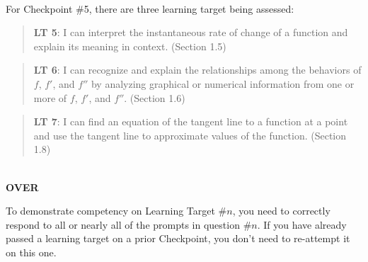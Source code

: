 \documentclass[11 pt]{article}
\begin{document}
\noindent \hrulefill \\

 For Checkpoint \#5, there are three learning target being assessed: 

\begin{quote}
{\bf LT 5}:  I can interpret the instantaneous rate of change of a function and explain its meaning in context.  (Section 1.5)
\end{quote}

\begin{quote}
{\bf LT 6}: I can recognize and explain the relationships among the behaviors of $f$, $f'$, and $f''$ by analyzing graphical or numerical information from one or more of $f$, $f'$, and $f''$. (Section 1.6)
\end{quote}

\begin{quote}
{\bf LT 7}: I can find an equation of the tangent line to a function at a point and use the tangent line to approximate values of the function. (Section 1.8)
\end{quote}


\noindent \hrulefill \\

\vfill \hfill {\bf OVER} 

\pagebreak


\noindent To demonstrate competency on Learning Target \#$n$, you need to correctly respond to all or nearly all of the prompts in question \#$n$.  If you have already passed a learning target on a prior Checkpoint, you don't need to re-attempt it on this one.
  
\end{document}
